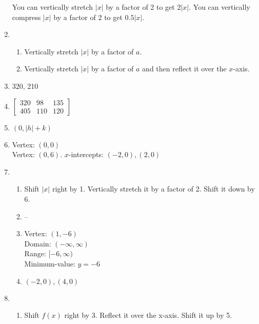 \documentclass{article}
\begin{document}
\begin{enumerate}
	You can vertically stretch $|x|$ by a factor of 2 to get $2|x|$. You can vertically compress $|x|$ by a factor of 2 to get $0.5|x|$.
	
\item

	\begin{enumerate}
	
	\item Vertically stretch $|x|$ by a factor of $a$.
	
	\item Vertically stretch $|x|$ by a factor of $a$ and then reflect it over the $x$-axis.
	
	\end{enumerate}
	
\item 320, 210

\item 
	$\begin{bmatrix}
	320 & 98 & 135 \\
	405 & 110 & 120
	\end{bmatrix}$
	
\item $(0, |h| + k)$

\item Vertex: $(0,0)$ \\
	Vertex: $(0, 6)$. $x$-intercepts: $(-2,0), (2, 0)$
	
\item
	\begin{enumerate}
	
	\item Shift $|x|$ right by 1. Vertically stretch it by a factor of 2. Shift it down by 6. 
	
	\item --
	
	\item Vertex: $(1, -6)$ \\
		Domain: $(-\infty, \infty)$ \\
		Range: $[-6, \infty)$ \\
		Minimum-value: $y = -6$
		
	\item $(-2, 0), (4, 0)$
	
	\end{enumerate}
	
\item
	\begin{enumerate}
	
	\item Shift $f(x)$ right by 3. Reflect it over the x-axis. Shift it up by 5.
	

\end{enumerate}
\end{enumerate}
\end{document}
